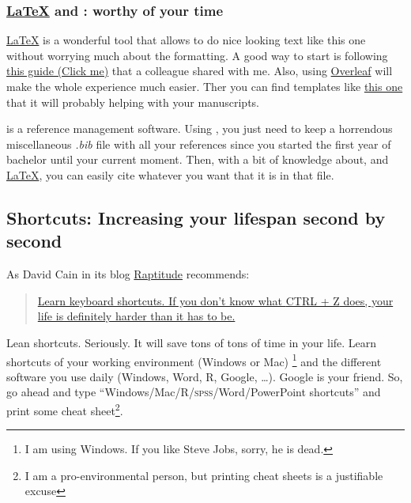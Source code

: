 \documentclass{article}
\begin{document}
\subsubsection{\href{https://www.latex-project.org/}{\LaTeX} and \href{http://www.bibtex.org/}{}: worthy of your time}

\href{https://www.latex-project.org/}{\LaTeX} is a wonderful tool that allows to do nice looking text like this one without worrying much about the formatting.
A good way to start is following \href{http://ptmartins.info/latex/}{this guide (Click me)} that a colleague %
shared with me. Also, using \href{https://www.overleaf.com/}{Overleaf} will make the whole experience much easier. Ther you can find templates like \href{https://www.overleaf.com/latex/templates/fred-slash-uf-working-paper-template/mjnnjxzqmydm}{this one} that it will probably helping with your manuscripts. 


\href{http://www.bibtex.org/}{} is a reference management software. Using \href{http://www.bibtex.org/}{}, you just need to keep a horrendous miscellaneous \emph{.bib} file with all your references since you started the first year of bachelor until your current moment. Then, with a bit of knowledge about, and \href{https://www.latex-project.org/}{\LaTeX}, you can easily cite whatever you want that it is in that file. 


\subsection{Shortcuts: Increasing your lifespan second by second}
\label{subsec: shortcut}
As David Cain in its blog \href{http://www.raptitude.com/}{Raptitude} recommends: 

\begin{quote}
    \begin{center}
        \href{https://www.raptitude.com/2015/02/67-short-pieces-of-advice-you-didnt-ask-for/}{Learn keyboard shortcuts. If you don’t know what \textsc{CTRL + Z} does, your life is definitely harder than it has to be. }
    \end{center}
\end{quote}

Lean shortcuts. Seriously. It will save tons of tons of time in your life. Learn shortcuts of your working environment (Windows or Mac) \footnote{I am using Windows. If you like Steve Jobs, sorry, he is dead. } and the different software you use daily (Windows, Word, R, Google, …). Google is your friend. So, go ahead and type “Windows/Mac/R/\textsc{spss}/Word/PowerPoint shortcuts” and print some cheat sheet\footnote{I am a pro-environmental person, but printing cheat sheets is a justifiable excuse}.
\end{document}
